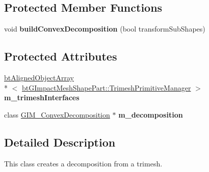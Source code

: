 \subsection*{Protected Member Functions}
\begin{DoxyCompactItemize}
\item 
\hypertarget{classbt_g_impact_convex_decomposition_shape_a14158c6eab7057a26102286abf15ee76}{void {\bfseries build\+Convex\+Decomposition} (bool transform\+Sub\+Shapes)}\label{classbt_g_impact_convex_decomposition_shape_a14158c6eab7057a26102286abf15ee76}

\end{DoxyCompactItemize}
\subsection*{Protected Attributes}
\begin{DoxyCompactItemize}
\item 
\hypertarget{classbt_g_impact_convex_decomposition_shape_a789e1086a066d07efb597cb7ac60ffc4}{\hyperlink{classbt_aligned_object_array}{bt\+Aligned\+Object\+Array}\\*
$<$ \hyperlink{classbt_g_impact_mesh_shape_part_1_1_trimesh_primitive_manager}{bt\+G\+Impact\+Mesh\+Shape\+Part\+::\+Trimesh\+Primitive\+Manager} $>$ {\bfseries m\+\_\+trimesh\+Interfaces}}\label{classbt_g_impact_convex_decomposition_shape_a789e1086a066d07efb597cb7ac60ffc4}

\item 
\hypertarget{classbt_g_impact_convex_decomposition_shape_a5162a55f455e46696c73eb08dde12872}{class \hyperlink{class_g_i_m___convex_decomposition}{G\+I\+M\+\_\+\+Convex\+Decomposition} $\ast$ {\bfseries m\+\_\+decomposition}}\label{classbt_g_impact_convex_decomposition_shape_a5162a55f455e46696c73eb08dde12872}

\end{DoxyCompactItemize}


\subsection{Detailed Description}
This class creates a decomposition from a trimesh. 

